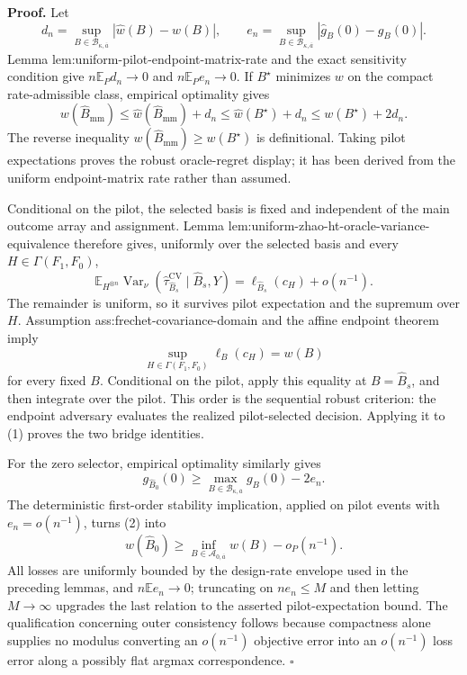 \textbf{Proof.}
Let
\[
d_n=\sup_{B\in\mathcal B_{\kappa,\overline a}}|\widehat w(B)-w(B)|,
\qquad
e_n=\sup_{B\in\mathcal B_{\kappa,\overline a}}|\widehat g_B(0)-g_B(0)|.
\]
Lemma lem:uniform-pilot-endpoint-matrix-rate and the exact sensitivity condition give \(n\mathbb E_Pd_n\to0\) and \(n\mathbb E_Pe_n\to0\).  If \(B^\star\) minimizes \(w\) on the compact rate-admissible class, empirical optimality gives
\[
w(\widehat B_{\mathrm{mm}})
\le\widehat w(\widehat B_{\mathrm{mm}})+d_n
\le\widehat w(B^\star)+d_n
\le w(B^\star)+2d_n.
\]
The reverse inequality \(w(\widehat B_{\mathrm{mm}})\ge w(B^\star)\) is definitional.  Taking pilot expectations proves the robust oracle-regret display; it has been derived from the uniform endpoint-matrix rate rather than assumed.

Conditional on the pilot, the selected basis is fixed and independent of the main outcome array and assignment.  Lemma lem:uniform-zhao-ht-oracle-variance-equivalence therefore gives, uniformly over the selected basis and every \(H\in\Gamma(F_1,F_0)\),
\[
\mathbb E_{H^{\otimes n}}
\operatorname{Var}_\nu
(\widehat\tau_{\widehat B_s}^{\mathrm{CV}}\mid\widehat B_s,Y)
=\ell_{\widehat B_s}(c_H)+o(n^{-1}). \tag{1}
\]
The remainder is uniform, so it survives pilot expectation and the supremum over \(H\).  Assumption ass:frechet-covariance-domain and the affine endpoint theorem imply
\[
\sup_{H\in\Gamma(F_1,F_0)}\ell_B(c_H)=w(B)
\]
for every fixed \(B\).  Conditional on the pilot, apply this equality at \(B=\widehat B_s\), and then integrate over the pilot.  This order is the sequential robust criterion: the endpoint adversary evaluates the realized pilot-selected decision.  Applying it to (1) proves the two bridge identities.

For the zero selector, empirical optimality similarly gives
\[
g_{\widehat B_0}(0)
\ge\max_{B\in\mathcal B_{\kappa,\overline a}}g_B(0)-2e_n. \tag{2}
\]
The deterministic first-order stability implication, applied on pilot events with \(e_n=o(n^{-1})\), turns (2) into
\[
w(\widehat B_0)
\ge\inf_{B\in\mathcal A_{0,\overline a}}w(B)-o_P(n^{-1}).
\]
All losses are uniformly bounded by the design-rate envelope used in the preceding lemmas, and \(n\mathbb E e_n\to0\); truncating on \(ne_n\le M\) and then letting \(M\to\infty\) upgrades the last relation to the asserted pilot-expectation bound.  The qualification concerning outer consistency follows because compactness alone supplies no modulus converting an \(o(n^{-1})\) objective error into an \(o(n^{-1})\) loss error along a possibly flat argmax correspondence. \(\square\)